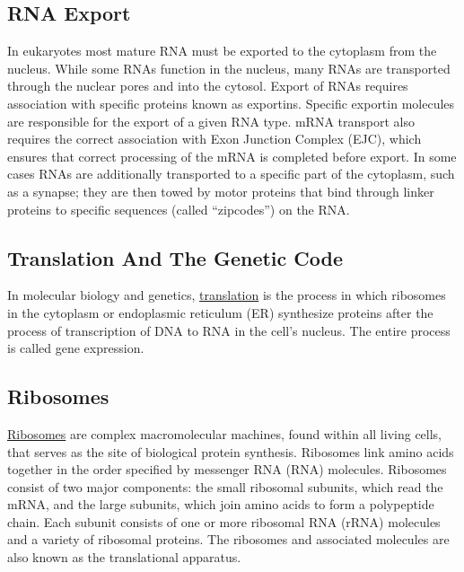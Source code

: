 \hypertarget{rna-export}{%
\subsection{RNA Export}\label{rna-export}}

In eukaryotes most mature RNA must be exported to the cytoplasm from the nucleus. While some RNAs function in the nucleus, many RNAs are transported through the nuclear pores and into the cytosol. Export of RNAs requires association with specific proteins known as exportins. Specific exportin molecules are responsible for the export of a given RNA type. mRNA transport also requires the correct association with Exon Junction Complex (EJC), which ensures that correct processing of the mRNA is completed before export. In some cases RNAs are additionally transported to a specific part of the cytoplasm, such as a synapse; they are then towed by motor proteins that bind through linker proteins to specific sequences (called ``zipcodes'') on the RNA.

\hypertarget{translation-and-the-genetic-code}{%
\subsection{Translation And The Genetic Code}\label{translation-and-the-genetic-code}}

In molecular biology and genetics, \href{https://en.wikipedia.org/wiki/Translation_(biology)}{translation} is the process in which ribosomes in the cytoplasm or endoplasmic reticulum (ER) synthesize proteins after the process of transcription of DNA to RNA in the cell's nucleus. The entire process is called gene expression.

\hypertarget{ribosomes}{%
\subsection{Ribosomes}\label{ribosomes}}

\href{https://en.wikipedia.org/wiki/Ribosome}{Ribosomes} are complex macromolecular machines, found within all living cells, that serves as the site of biological protein synthesis. Ribosomes link amino acids together in the order specified by messenger RNA (RNA) molecules. Ribosomes consist of two major components: the small ribosomal subunits, which read the mRNA, and the large subunits, which join amino acids to form a polypeptide chain. Each subunit consists of one or more ribosomal RNA (rRNA) molecules and a variety of ribosomal proteins. The ribosomes and associated molecules are also known as the translational apparatus.

